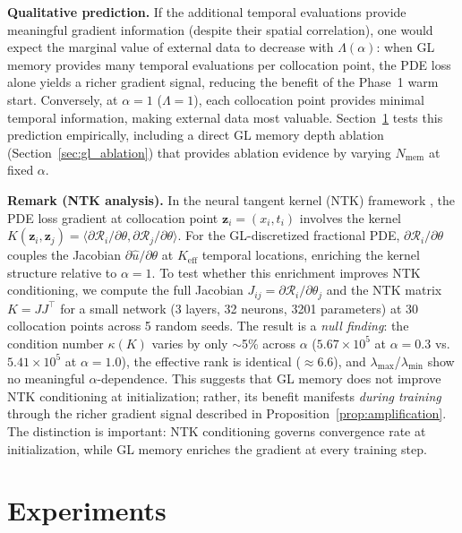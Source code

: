 \documentclass[preprint,12pt]{elsarticle}
\newcommand{\Rcal}{\mathcal{R}}
\begin{document}
\textbf{Qualitative prediction.} If the additional temporal evaluations provide meaningful gradient information (despite their spatial correlation), one would expect the marginal value of external data to decrease with $\Lambda(\alpha)$: when GL memory provides many temporal evaluations per collocation point, the PDE loss alone yields a richer gradient signal, reducing the benefit of the Phase~1 warm start. Conversely, at $\alpha = 1$ ($\Lambda = 1$), each collocation point provides minimal temporal information, making external data most valuable. Section~\ref{sec:experiments} tests this prediction empirically, including a direct GL memory depth ablation (Section~\ref{sec:gl_ablation}) that provides ablation evidence by varying $N_{\mathrm{mem}}$ at fixed $\alpha$.

\textbf{Remark (NTK analysis).} In the neural tangent kernel (NTK) framework \cite{wang2022ntk}, the PDE loss gradient at collocation point $\bm{z}_i = (x_i, t_i)$ involves the kernel $K(\bm{z}_i, \bm{z}_j) = \langle \partial \Rcal_i/\partial\theta, \partial \Rcal_j/\partial\theta \rangle$. For the GL-discretized fractional PDE, $\partial \Rcal_i/\partial\theta$ couples the Jacobian $\partial\hat{u}/\partial\theta$ at $K_{\mathrm{eff}}$ temporal locations, enriching the kernel structure relative to $\alpha = 1$. To test whether this enrichment improves NTK conditioning, we compute the full Jacobian $J_{ij} = \partial \Rcal_i/\partial\theta_j$ and the NTK matrix $K = JJ^\top$ for a small network (3 layers, 32 neurons, 3201 parameters) at 30 collocation points across 5 random seeds. The result is a \emph{null finding}: the condition number $\kappa(K)$ varies by only $\sim$5\% across $\alpha$ ($5.67 \times 10^5$ at $\alpha = 0.3$ vs.\ $5.41 \times 10^5$ at $\alpha = 1.0$), the effective rank is identical ($\approx 6.6$), and $\lambda_{\max}$/$\lambda_{\min}$ show no meaningful $\alpha$-dependence. This suggests that GL memory does not improve NTK conditioning at initialization; rather, its benefit manifests \emph{during training} through the richer gradient signal described in Proposition~\ref{prop:amplification}. The distinction is important: NTK conditioning governs convergence rate at initialization, while GL memory enriches the gradient at every training step.

\section{Experiments}
\label{sec:experiments}
\end{document}

